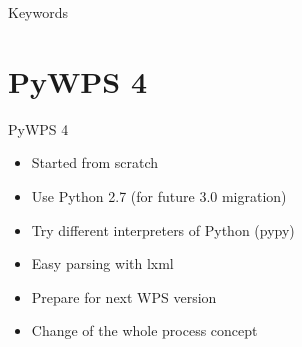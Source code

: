 \documentclass[xcolor=dvipsnames]{beamer}
\begin{document}
\begin{frame}{Keywords}
\begin{center}
    \end{center}
\end{frame}

\section{PyWPS 4}
\begin{frame}{PyWPS 4}
    \begin{itemize}
        \item Started from scratch
            \pause
        \item Use Python 2.7 (for future 3.0 migration)
            \pause
        \item Try different interpreters of Python (pypy)
            \pause
        \item Easy parsing with lxml
            \pause
        \item Prepare for next WPS version
            \pause
        \item Change of the whole process concept
            \pause
    \end{itemize}
\end{frame}
\end{document}
